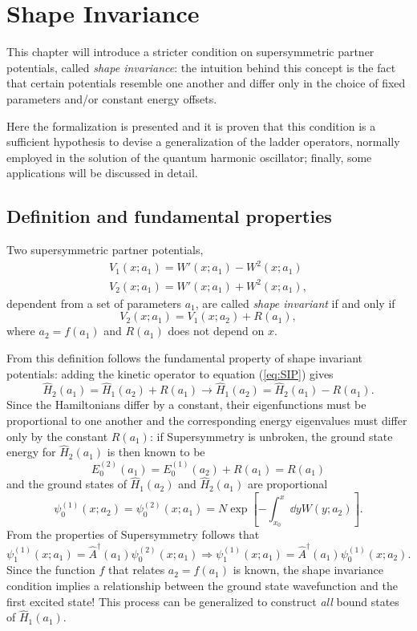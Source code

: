 \newpage
\chapter{Shape Invariance}
\thispagestyle{empty}
This chapter will introduce a stricter condition on supersymmetric partner potentials, called
\textit{shape invariance}: the intuition behind this concept is the fact that certain
potentials resemble one another and differ only in the choice of fixed parameters
and/or constant energy offsets.

Here the formalization is presented and it is proven that this condition is
a sufficient hypothesis to devise a generalization of the ladder operators, normally
employed in the solution of the quantum harmonic oscillator; finally, some applications
will be discussed in detail.
\section{Definition and fundamental properties}
\begin{defn}
Two supersymmetric partner potentials,
\begin{gather*}
V_1(x;a_1) = W'(x;a_1) - W^2(x;a_1)\\
V_2(x;a_1) = W'(x;a_1) + W^2(x;a_1),
\end{gather*}
dependent from a set of parameters $a_1$, are called \textit{shape invariant} if and only if
\begin{equation}
V_2(x;a_1) = V_1(x;a_2)+R(a_1),
\label{eq:SIP}
\end{equation}
where $a_2 = f(a_1)$ and $R(a_1)$ does not depend on $x$.
\label{def:SIP}
\end{defn}
From this definition follows the fundamental property of shape invariant potentials:
adding the kinetic operator to equation (\ref{eq:SIP}) gives
$$\hat H_2(a_1) = \hat H_1(a_2)+R(a_1)\longrightarrow\hat H_1(a_2) = \hat H_2(a_1)-R(a_1).$$
Since the Hamiltonians differ by a constant, their eigenfunctions must be proportional to
one another and the corresponding energy eigenvalues must differ only by the constant
$R(a_1)$:
if Supersymmetry is unbroken,
the ground state energy for $\hat H_2(a_1)$ is then known to be
$$E^{(2)}_0(a_1) = E^{(1)}_0(a_2)+R(a_1)=R(a_1)$$
and the ground states of $\hat H_1(a_2)$ and $\hat H_2(a_1)$ are proportional
$$\psi^{(1)}_0(x;a_2)=\psi^{(2)}_0(x;a_1)=N\exp\left[-\int_{x_0}^{x}\dd y W(y;a_2)
\right].$$
From the properties of Supersymmetry follows that
$$\psi_1^{(1)}(x;a_1)=\hat A^\dagger(a_1)\psi^{(2)}_0(x;a_1)\Rightarrow
\psi^{(1)}_1(x;a_1)=\hat A^\dagger(a_1)\psi^{(1)}_0(x;a_2).$$
Since the function $f$ that relates $a_2=f(a_1)$ is known, the shape invariance condition
implies a relationship between the ground state wavefunction and the first excited state!
This process can be generalized to construct \textit{all} bound states of $\hat H_1(a_1)$.
